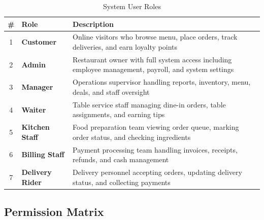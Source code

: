 \documentclass[12pt,a4paper]{article}
\begin{document}
\begin{table}[h]
\centering
\begin{tabular}{@{}clp{8cm}@{}}
\toprule
\textbf{\#} & \textbf{Role} & \textbf{Description} \\
\midrule
1 & \textbf{Customer} & Online visitors who browse menu, place orders, track deliveries, and earn loyalty points \\
2 & \textbf{Admin} & Restaurant owner with full system access including employee management, payroll, and system settings \\
3 & \textbf{Manager} & Operations supervisor handling reports, inventory, menu, deals, and staff oversight \\
4 & \textbf{Waiter} & Table service staff managing dine-in orders, table assignments, and earning tips \\
5 & \textbf{Kitchen Staff} & Food preparation team viewing order queue, marking order status, and checking ingredients \\
6 & \textbf{Billing Staff} & Payment processing team handling invoices, receipts, refunds, and cash management \\
7 & \textbf{Delivery Rider} & Delivery personnel accepting orders, updating delivery status, and collecting payments \\
\bottomrule
\end{tabular}
\caption{System User Roles}
\end{table}

\subsection{Permission Matrix}
\end{document}

